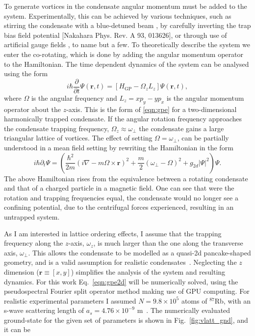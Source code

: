 To generate vortices in the condensate angular momentum must be added to the system. Experimentally, this can be achieved by various techniques, such as stirring the condensate with a blue-detuned beam \cite{Vtx:Raman_prl_2001}, by carefully inverting the trap bias field potential \cite{Vtx:Kawaguchi_pra_2004}[Nakahara Phys. Rev. A 93, 013626], or through use of artificial gauge fields \cite{AO:Dalibard_rmp_2011}, to name but a few. To theoretically describe the system we enter the co-rotating, which is done by adding the angular momentum operator to the Hamiltonian. The time dependent dynamics of the system can be analysed using the form
\begin{equation}\label{eqn:gpe2d}
	i\hbar\frac{\partial}{\partial t}\Psi(\mathbf{r},t) = \left[ H_{\text{GP}}  -  \Omega_z L_z \right] \Psi(\mathbf{r},t),
\end{equation}
where $\Omega$ is the angular frequency and $L_z = xp_y - yp_x$ is the angular momentum operator about the $z$-axis. This is the form of \eqref{eqn:gpe} for a two-dimensional harmonically trapped condensate. If the angular rotation frequency approaches the condensate trapping frequency, $\Omega_z \approx \omega_\perp$ the condensate gains a large triangular lattice of vortices.  The effect of setting $\Omega=\omega_\perp$, can be partially understood in a mean field setting by rewriting the Hamiltonian in the form
\begin{equation}
    i\hbar\partial_t \Psi =
    \left(\frac{\hbar^2}{2m}(i\nabla - m\Omega\times\mathbf{r})^2 + \frac{m}{2}(\omega_\perp - \Omega)^2 + g_{2d}|\Psi|^2 \right)\Psi.
\end{equation}
The above Hamiltonian rises from the equivalence between a rotating condensate and that of a charged particle in a magnetic field. One can see that were the rotation and trapping frequencies equal, the condensate would no longer see a confining potential, due to the centrifugal forces experienced, resulting in an untrapped system.

As I am interested in lattice ordering effects, I assume that the trapping frequency along the $z$-axis, $\omega_z$, is much larger than the one along the transverse axis, $\omega_\perp$. This allows the condensate to be modelled as a quasi-2d pancake-shaped geometry, and is a valid assumption for realistic condensates~\cite{BEC:Fetter_revmodphys_2009}. Neglecting the $z$ dimension ($\textbf{r}\equiv [x,y]$) simplifies the analysis of the system and resulting dynamics. For this work Eq.~\eqref{eqn:gpe2d} will be numerically solved, using the pseudospectral Fourier split operator method making use of GPU computing\cite{NUMERICS}. For realistic experimental parameters I assumed  $N=9.8\times 10^5$ atoms of $^{87}$Rb, with an s-wave scattering length of $a_s=4.76\times10^{-9}$ m~\cite{AO:Roberts_prl_1998}. The numerically evaluated ground-state for the given set of parameters is shown in Fig.~\ref{fig:vlatt_gnd}, and it can be

